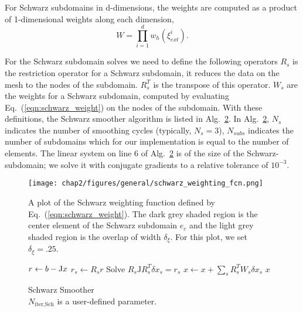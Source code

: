 For Schwarz subdomains in d-dimensions, the weights are computed
as a product of 1-dimensional weights along each dimension,
%
\begin{equation}
  W = \prod_{i=1}^{d} w_h(\xi^i_{ext}).
\end{equation}

%
For the Schwarz subdomain solves we
need to define the following operators\harald{\sout{,}:} $R_s$ is the restriction
operator for a Schwarz subdomain, it reduces the data on the mesh to
the nodes of the subdomain. $R_s^T$ is the transpose of this
operator. $W_s$ are the weights for a Schwarz subdomain, computed by
evaluating Eq.~(\ref{eqn:schwarz_weight}) on the nodes of the
subdomain. With these definitions, the Schwarz smoother algorithm is
listed in Alg.~\ref{alg:schwarz_smoother}. In
Alg.~\ref{alg:schwarz_smoother}, $N_s$ indicates the number of
smoothing cycles (typically, $N_s=3$), $N_{subs}$ indicates the number of subdomains which for our implementation is equal to the number of elements. The linear
system on line 6 of Alg.~\ref{alg:schwarz_smoother} is of the size of the Schwarz-subdomain; we solve it with conjugate gradients to a relative tolerance of $10^{-3}$.

\begin{figure}[ht!]
  \centering
  \texttt{[image: chap2/figures/general/schwarz\_weighting\_fcn.png]}
\caption{
  \label{fig:schwarz_weight}
  A plot of the Schwarz weighting function defined by Eq.~(\ref{eqn:schwarz_weight}). The dark grey shaded region is the center element of the Schwarz subdomain  $e_c$  and the light grey shaded region is the overlap of width $\delta_\xi$. For this plot, we set $\delta_\xi = .25$.
}
\end{figure}
%
\begin{figure}[ht!]
  \begin{algorithm}[H]
    \caption{\label{alg:schwarz_smoother}
      Schwarz Smoother\\ $N_{\text{iter,Sch}}$ is a user-defined parameter.
    }
    \begin{algorithmic}[1]
      \State $r \leftarrow b - {\rm J}x$  %
      \State $r_s \leftarrow R_s r$
      \State Solve $R_s \mathrm{J} R^T_s \delta x_s = r_s$
      \EndFor
      \State $x \leftarrow x + \sum_{s}R_s^TW_s\delta x_s$
      \EndFor
      \State \Return $x$
      \EndFunction
    \end{algorithmic}
  \end{algorithm}
\end{figure}
%
%
